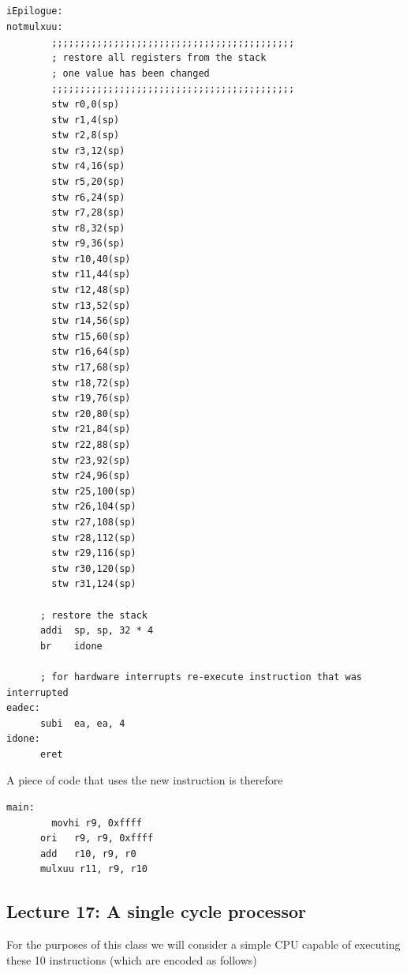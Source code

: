 \documentclass[../notes.tex]{subfiles}
\begin{document}
\begin{listing}[H]
\begin{verbatim}



 
iEpilogue:
notmulxuu:
        ;;;;;;;;;;;;;;;;;;;;;;;;;;;;;;;;;;;;;;;;;;;
        ; restore all registers from the stack
        ; one value has been changed
        ;;;;;;;;;;;;;;;;;;;;;;;;;;;;;;;;;;;;;;;;;;;
        stw r0,0(sp)
        stw r1,4(sp)
        stw r2,8(sp)
        stw r3,12(sp)
        stw r4,16(sp)
        stw r5,20(sp)
        stw r6,24(sp)
        stw r7,28(sp)
        stw r8,32(sp)
        stw r9,36(sp)
        stw r10,40(sp)
        stw r11,44(sp)
        stw r12,48(sp)
        stw r13,52(sp)
        stw r14,56(sp)
        stw r15,60(sp)
        stw r16,64(sp)
        stw r17,68(sp)
        stw r18,72(sp)
        stw r19,76(sp)
        stw r20,80(sp)
        stw r21,84(sp)
        stw r22,88(sp)
        stw r23,92(sp)
        stw r24,96(sp)
        stw r25,100(sp)
        stw r26,104(sp)
        stw r27,108(sp)
        stw r28,112(sp)
        stw r29,116(sp)
        stw r30,120(sp)
        stw r31,124(sp)
 
      ; restore the stack
      addi  sp, sp, 32 * 4
      br    idone
 
      ; for hardware interrupts re-execute instruction that was interrupted
eadec:
      subi  ea, ea, 4
idone:
      eret
\end{verbatim}
\end{listing}




A piece of code that uses the new instruction is therefore


\begin{listing}[H]
\begin{verbatim}
main:
	    movhi r9, 0xffff
      ori   r9, r9, 0xffff
      add   r10, r9, r0
      mulxuu r11, r9, r10
\end{verbatim}
\end{listing}




\subsection{Lecture 17: A single cycle processor}

For the purposes of this class we will consider a simple CPU capable of executing these 10 instructions (which are encoded as follows)
\end{document}
